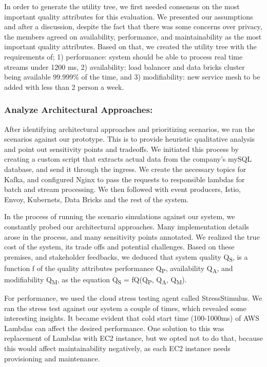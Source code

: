 \documentclass[runningheads]{llncs}
\begin{document}
In order to generate the utility tree, we first needed consensus on the most important quality attributes for this evaluation. We presented our assumptions and after a discussion, despite the fact that there was some concerns over privacy, the members agreed on availability, performance, and maintainability as the most important quality attributes. Based on that, we created the utility tree with the requirements of; 1) performance: system should be able to process real time streams under 1200 ms, 2) availability: load balancer and data bricks cluster being available 99.999\% of the time, and 3) modifiability: new service mesh to be added with less than 2 person a week.

\subsubsection{Analyze Architectural Approaches: }

After identifying architectural approaches and prioritizing scenarios, we ran the scenarios against our prototype. This is to provide heuristic qualitative analysis and point out sensitivity points and tradeoffs. We initiated this process by creating a custom script that extracts actual data from the company's mySQL database, and send it through the ingress. We create the necessary topics for Kafka, and configured Nginx to pass the requests to responsible lambdas for batch and stream processing. We then followed with event producers, Istio, Envoy, Kubernets, Data Bricks and the rest of the system. 

In the process of running the scenario simulations against our system, we constantly probed our architectural approaches. Many implementation details arose in the process, and many sensitivity points annotated. We realized the true cost of the system, its trade offs and potential challenges. Based on these premises, and stakeholder feedbacks, we deduced that system quality Q\textsubscript{S}, is a function f of the quality attributes performance Q\textsubscript{P}, availability Q\textsubscript{A}, and modifiability Q\textsubscript{M}, as the equation Q\textsubscript{S} = fQ(Q\textsubscript{P}, Q\textsubscript{A}, Q\textsubscript{M}).

For performance, we used the cloud stress testing agent called StressStimulus. We ran the stress test against our system a couple of times, which revealed some interesting insights. It became evident that cold start time (100-1000ms) of AWS Lambdas can affect the desired performance. One solution to this was replacement of Lambdas with EC2 instance, but we opted not to do that, because this would affect maintainability negatively, as each EC2 instance needs provisioning and maintenance. 
\end{document}
